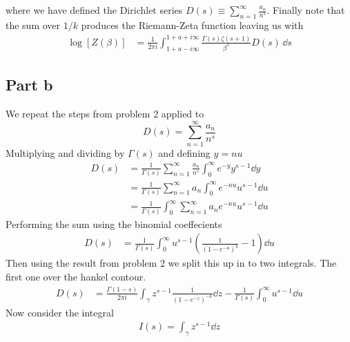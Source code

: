 \documentclass[a4paper,12pt]{article}
\begin{document}
where we have defined the Dirichlet series $D(s)\equiv\sum_{n=1}^{\infty}\frac{a_n}{n^s}$. Finally note that the sum over $1/k$ produces the Riemann-Zeta function leaving us with
\begin{equation}
	\begin{aligned}
		\log [Z(\beta)]
		&=\frac{1}{2\pi i}\int_{1+a-i\infty}^{1+a+i\infty}\frac{\Gamma(s)\zeta(s+1)}{\beta^s}D(s)\,\dd s 
	\end{aligned}
\end{equation}
\subsection*{Part b}
We repeat the steps from problem 2 applied to
\begin{equation}
D(s)=\sum_{n=1}^{\infty} \frac{a_n}{n^s}
\end{equation}
Multiplying and dividing by $\Gamma(s)$ and defining $y=nu$
\begin{equation}
	\begin{aligned}
		D(s)&=\frac{1}{\Gamma(s)}\sum_{n=1}^{\infty}\frac{a_n}{n^s}\int_{0}^{\infty}e^{-y}y^{s-1}\dd y\\
		&=\frac{1}{\Gamma(s)}\sum_{n=1}^{\infty}a_n\int_{0}^{\infty}e^{-nu}u^{s-1}\dd u\\
		&=\frac{1}{\Gamma(s)}\int_{0}^{\infty}\sum_{n=1}^{\infty}a_ne^{-nu}u^{s-1}\dd u
	\end{aligned}
\end{equation}
Performing the sum using the binomial coeffecients
\begin{equation}
	\begin{aligned}
		D(s)
		&=\frac{1}{\Gamma(s)}\int_{0}^{\infty}u^{s-1}\left(\frac{1}{\left(1-e^{-u}\right)^k}-1\right)
		\dd u
	\end{aligned}
\end{equation}
Then using the result from problem 2 we split this up in to two integrals. The first one over the hankel contour.
\begin{equation}
	\begin{aligned}
		D(s)
				&=
		\frac{\Gamma(1-s)}{2\pi i}\int_\gamma
		z^{s-1}\frac{1}{(1-e^{-z})^{-k}} \dd z-\frac{1}{\Gamma(s)}\int_{0}^{\infty}u^{s-1}
		\dd u
	\end{aligned}
\end{equation}
Now consider the integral
\begin{equation}
	\begin{aligned}
I(s)=\int_\gamma z^{s-1}
		\dd z
	\end{aligned}
\end{equation}
\end{document}
